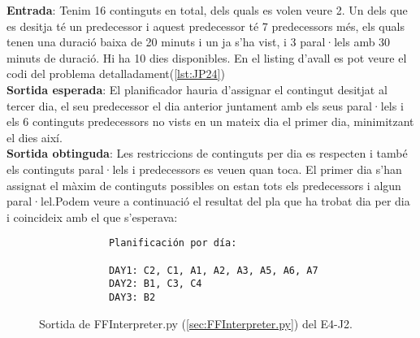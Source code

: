 \documentclass[a4paper]{article}
\begin{document}
	\noindent \textbf{Entrada}: Tenim 16 continguts en total, dels quals es volen veure 2. Un dels que es desitja té un predecessor i aquest predecessor té 7 predecessors més, els quals tenen una duració baixa de 20 minuts i un ja s'ha vist, i 3 paral·lels amb 30 minuts de duració. Hi ha 10 dies disponibles. En el listing d'avall es pot veure el codi del problema detalladament(\ref{lst:JP24})\\
	
	\noindent \textbf{Sortida esperada}: El planificador hauria d'assignar el contingut desitjat al tercer dia, el seu predecessor el dia anterior juntament amb els seus paral·lels i els 6 continguts predecessors no vists en un mateix dia el primer dia, minimitzant el dies així.\\
	
	\noindent \textbf{Sortida obtinguda}: Les restriccions de continguts per dia es respecten i també els continguts paral·lels i predecessors es veuen quan toca. El primer dia s'han assignat el màxim de continguts possibles on estan tots els predecessors i algun paral·lel.Podem veure a continuació el resultat del pla que ha trobat dia per dia i coincideix amb el que s'esperava:
	
	\begin{figure}[H]
		\centering
		\begin{verbatim}
			Planificación por día:
			
			DAY1: C2, C1, A1, A2, A3, A5, A6, A7
			DAY2: B1, C3, C4
			DAY3: B2
		\end{verbatim}
		\caption{Sortida de FFInterpreter.py (\ref{sec:FFInterpreter.py}) del E4-J2.}
	\end{figure}
	
	
	
\end{document}
